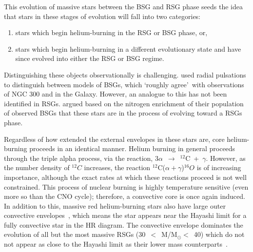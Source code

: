 {This evolution of massive stars between the BSG and RSG phase seeds the idea that stars in these stages of evolution will fall into two categories:

\begin{enumerate}
    \item stars which begin helium-burning in the RSG or BSG phase, or,
    \item stars which begin helium-burning in a different evolutionary state and have since evolved into either the RSG or BSG regime.
\end{enumerate}

Distinguishing these objects observationally is challenging.
\cite{Saio13} used radial pulsations to distinguish between models of BSGs, which \textquoteleft roughly agree\textquoteright ~with observations of NGC 300 and in the Galaxy.
However, an analogue to this has not been identified in RSGs.
\cite{2012A&A...542A..79C} argued based on the nitrogen enrichment of their population of observed BSGs that these stars are in the process of evolving toward a RSGs phase.

Regardless of how extended the external envelopes in these stars are, core helium-burning proceeds in an identical manner.
Helium burning in general proceeds through the triple alpha process, via the reaction, 3$\alpha$~$\rightarrow$~$^{12}$C~+~$\gamma$.
However, as the number density of $^{12}C$ increases, the reaction $^{12}$C($\alpha+\gamma$)$^{16}O$ is of increasing importance, although the exact rates at which these reactions proceed is not well constrained.
This process of nuclear burning is highly temperature sensitive (even more so than the CNO cycle); therefore, a convective core is once again induced.
In addition to this, massive red helium-burning stars also have large outer convective envelopes~\citep{2012sse..book.....K}, which means the star appears near the Hayashi limit for a fully convective star in the HR diagram.
The convective envelope dominates the evolution of all but the most massive RSGs (30~$<$~M/M$_{\odot}<$~40) which do not not appear as close to the Hayashi limit as their lower mass counterparts~\citep[see Figure 1 in][]{Saio13}.

}
